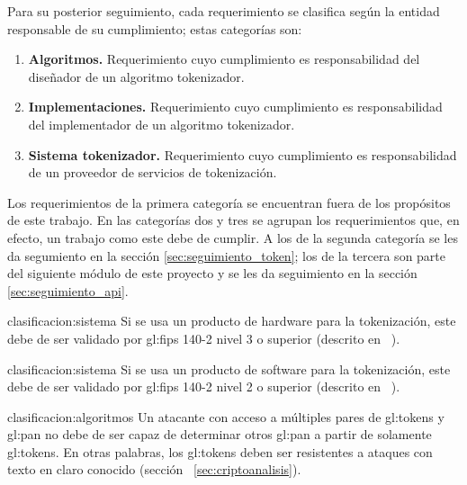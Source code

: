 Para su posterior seguimiento, cada requerimiento se clasifica según la
entidad responsable de su cumplimiento; estas categorías son:

\begin{enumerate}

  \item \textbf{\hypertarget{clasificacion:algoritmos}{Algoritmos}.}
    Requerimiento cuyo cumplimiento es responsabilidad del diseñador de un
    algoritmo tokenizador.

  \item \textbf{\hypertarget{clasificacion:implementaciones}{Implementaciones}.}
    Requerimiento cuyo cumplimiento es responsabilidad del implementador de un
    algoritmo tokenizador.

  \item \textbf{\hypertarget{clasificacion:sistema}{Sistema tokenizador}.}
    Requerimiento cuyo cumplimiento es responsabilidad de un proveedor de
    servicios de tokenización.

\end{enumerate}

Los requerimientos de la primera categoría se encuentran fuera de los
propósitos de este trabajo. En las categorías dos y tres se agrupan
los requerimientos que, en efecto, un trabajo como este debe de cumplir.
A los de la segunda categoría se les da segumiento en la sección
\ref{sec:seguimiento_token}; los de la tercera son parte del siguiente módulo
de este proyecto y se les da seguimiento en la sección
\ref{sec:seguimiento_api}.

{clasificacion:sistema}
{
  Si se usa un producto de hardware para la tokenización, este debe de ser
  validado por \gls{gl:fips} 140-2 nivel 3 o superior (descrito en
 ~\cite{nist_modulos_criptograficos}).
}

{clasificacion:sistema}
{
  Si se usa un producto de software para la tokenización, este debe de ser
  validado por \gls{gl:fips} 140-2 nivel 2 o superior (descrito en
 ~\cite{nist_modulos_criptograficos}).
}

{clasificacion:algoritmos}
{
  Un atacante con acceso a múltiples pares de \glspl{gl:token} y
  \gls{gl:pan} no debe de ser capaz de determinar otros \gls{gl:pan} a partir
  de solamente \glspl{gl:token}. En otras palabras, los \glspl{gl:token}
  deben ser resistentes a ataques con texto en claro conocido (sección
 ~\ref{sec:criptoanalisis}).
}

